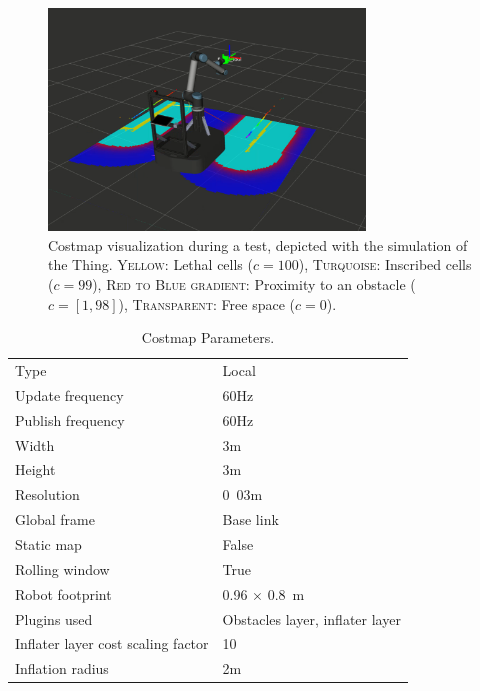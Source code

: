 \begin{figure}
   \centering
   \includegraphics[width=0.75\textwidth]{images/costmap.png}
   \caption{Costmap visualization during a test, depicted with the simulation of the Thing.  \textsc{Yellow:} Lethal cells ($c = 100$), \textsc{Turquoise:} Inscribed cells ($c = 99$), \textsc{Red to Blue gradient:} Proximity to an obstacle ($c = [1,98]$), \textsc{Transparent:} Free space ($c = 0$).}
   \label{pics:costmap}
\end{figure}

\begin{table}[h]
\begin{center}
 \caption{Costmap Parameters.}\vspace{1ex}
 \label{tab:costmap_params}
 \begin{tabular}{ll}
 \hline
Type & Local \\
Update frequency & \unit{60}{Hz} \\
Publish frequency & \unit{60}{Hz} \\ 
Width & \unit{3}{m} \\
Height & \unit{3}{m} \\
Resolution & \unit{0.03}{m} \\
Global frame & Base link \\
Static map & False \\
Rolling window & True \\
Robot footprint & \unit{0.96 $\times$ 0.8}{m} \\
Plugins used & Obstacles layer, inflater layer \\
Inflater layer cost scaling factor & 10  \\
Inflation radius & \unit{2}{m} \\
 \hline
 \end{tabular}
\end{center}
\end{table}

